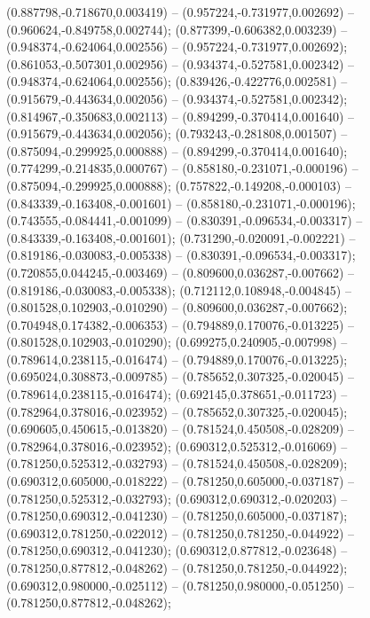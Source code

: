  (0.887798,-0.718670,0.003419) -- (0.957224,-0.731977,0.002692) -- (0.960624,-0.849758,0.002744);
 (0.877399,-0.606382,0.003239) -- (0.948374,-0.624064,0.002556) -- (0.957224,-0.731977,0.002692);
 (0.861053,-0.507301,0.002956) -- (0.934374,-0.527581,0.002342) -- (0.948374,-0.624064,0.002556);
 (0.839426,-0.422776,0.002581) -- (0.915679,-0.443634,0.002056) -- (0.934374,-0.527581,0.002342);
 (0.814967,-0.350683,0.002113) -- (0.894299,-0.370414,0.001640) -- (0.915679,-0.443634,0.002056);
 (0.793243,-0.281808,0.001507) -- (0.875094,-0.299925,0.000888) -- (0.894299,-0.370414,0.001640);
 (0.774299,-0.214835,0.000767) -- (0.858180,-0.231071,-0.000196) -- (0.875094,-0.299925,0.000888);
 (0.757822,-0.149208,-0.000103) -- (0.843339,-0.163408,-0.001601) -- (0.858180,-0.231071,-0.000196);
 (0.743555,-0.084441,-0.001099) -- (0.830391,-0.096534,-0.003317) -- (0.843339,-0.163408,-0.001601);
 (0.731290,-0.020091,-0.002221) -- (0.819186,-0.030083,-0.005338) -- (0.830391,-0.096534,-0.003317);
 (0.720855,0.044245,-0.003469) -- (0.809600,0.036287,-0.007662) -- (0.819186,-0.030083,-0.005338);
 (0.712112,0.108948,-0.004845) -- (0.801528,0.102903,-0.010290) -- (0.809600,0.036287,-0.007662);
 (0.704948,0.174382,-0.006353) -- (0.794889,0.170076,-0.013225) -- (0.801528,0.102903,-0.010290);
 (0.699275,0.240905,-0.007998) -- (0.789614,0.238115,-0.016474) -- (0.794889,0.170076,-0.013225);
 (0.695024,0.308873,-0.009785) -- (0.785652,0.307325,-0.020045) -- (0.789614,0.238115,-0.016474);
 (0.692145,0.378651,-0.011723) -- (0.782964,0.378016,-0.023952) -- (0.785652,0.307325,-0.020045);
 (0.690605,0.450615,-0.013820) -- (0.781524,0.450508,-0.028209) -- (0.782964,0.378016,-0.023952);
 (0.690312,0.525312,-0.016069) -- (0.781250,0.525312,-0.032793) -- (0.781524,0.450508,-0.028209);
 (0.690312,0.605000,-0.018222) -- (0.781250,0.605000,-0.037187) -- (0.781250,0.525312,-0.032793);
 (0.690312,0.690312,-0.020203) -- (0.781250,0.690312,-0.041230) -- (0.781250,0.605000,-0.037187);
 (0.690312,0.781250,-0.022012) -- (0.781250,0.781250,-0.044922) -- (0.781250,0.690312,-0.041230);
 (0.690312,0.877812,-0.023648) -- (0.781250,0.877812,-0.048262) -- (0.781250,0.781250,-0.044922);
 (0.690312,0.980000,-0.025112) -- (0.781250,0.980000,-0.051250) -- (0.781250,0.877812,-0.048262);
